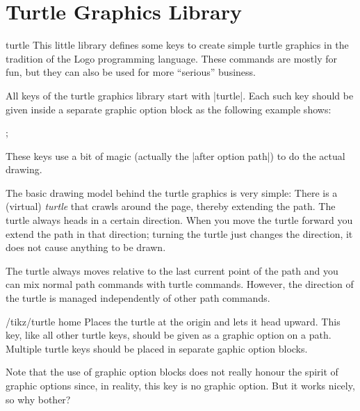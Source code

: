%
%
%

\section{Turtle Graphics Library}
\label{section-library-tutrle}


\begin{pgflibrary}{turtle}
  This little library defines some keys to create simple turtle
  graphics in the tradition of the Logo programming language. These
  commands are mostly for fun, but they can also be used for more
  ``serious'' business.
\end{pgflibrary}


All keys of the turtle graphics library start with |turtle|. Each such
key should be given inside a separate graphic option block as the
following example shows:

\begin{codeexample}[]
\tikz {};
\end{codeexample}

These keys use a bit of magic (actually the |after option path|) to do 
the actual drawing. 

The basic drawing model behind the turtle graphics is very simple:
There is a (virtual) \emph{turtle} that crawls around the page,
thereby extending the path. The turtle always heads in a certain
direction. When you move the turtle forward you extend the path in
that direction; turning the turtle just changes the direction, it does
not cause anything to be drawn.

The turtle always moves relative to the last current point of the
path and you can mix normal path commands with turtle
commands. However, the direction of the turtle is managed
independently of other path commands.

\begin{key}{/tikz/turtle home}
  Places the turtle at the origin and lets it head upward. This key,
  like all other turtle keys, should be given as a graphic option on a
  path. Multiple turtle keys should be placed in separate gaphic
  option blocks.

  Note that the use of graphic option blocks does not really honour
  the spirit of graphic options since, in reality, this key is no
  graphic option. But it works nicely, so why bother?
\end{key}

